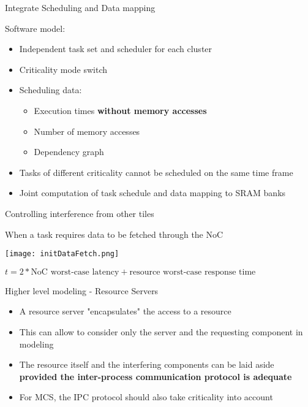\begin{frame}{Integrate Scheduling and Data mapping}

Software model:

\begin{itemize}
\item {} {Independent task set and scheduler for each cluster}
\item {} {Criticality mode switch}
\item {} {Scheduling data:
\begin{itemize}
\item Execution times \textbf{without memory accesses}
\item Number of memory accesses
\item Dependency graph
\end{itemize}}
\item {} {Tasks of different criticality cannot be scheduled on the same time frame}
\item {} {Joint computation of task schedule and data mapping to SRAM banks}

\end{itemize}
\end{frame}

\begin{frame}{Controlling interference from other tiles}

When a task requires data to be fetched through the NoC

\vspace{1cm}

\texttt{[image: initDataFetch.png]}

\vspace{0.5cm}

\(t = 2* \text{NoC worst-case latency} + \text{resource worst-case response time}\)

\end{frame}

\begin{frame}{Higher level modeling - Resource Servers}
\begin{itemize}
\item {} {A resource server "encapsulates" the access to a resource}
\item {} {This can allow to consider only the server and the requesting component in modeling}
\item {} {The resource itself and the interfering components can be laid aside \textbf{provided the inter-process communication protocol is adequate}}
\item {} {For MCS, the IPC protocol should also take criticality into account}
\end{itemize}
\end{frame}

